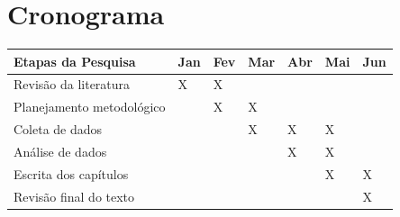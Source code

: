 \chapter[Cronograma]{Cronograma}

\begin{table}[htb]
  \renewcommand{\arraystretch}{1.5}
  \ABNTEXfontereduzida
  \label{tab-cronograma}
  \begin{tabular}{p{6cm} p{1.2cm} p{1.2cm} p{1.2cm} p{1.2cm} p{1.2cm} p{1.2cm}}
    \hline
     \textbf{Etapas da Pesquisa} & \textbf{Jan} & \textbf{Fev} & \textbf{Mar} & \textbf{Abr} & \textbf{Mai} & \textbf{Jun} \\
    \hline
    Revisão da literatura & X & X &   &   &   &   \\ \hline
    Planejamento metodológico &   & X & X &   &   &   \\ \hline
    Coleta de dados &   &   & X & X & X &   \\ \hline
    Análise de dados &   &   &   & X & X &   \\ \hline
    Escrita dos capítulos &   &   &   &   & X & X \\ \hline
    Revisão final do texto &   &   &   &   &   & X \\ \hline
  \end{tabular}
\end{table}
